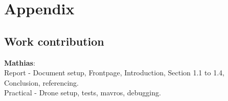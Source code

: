 \chapter{Appendix}
\section*{Work contribution}
\textbf{Mathias}:\\
Report - Document setup, Frontpage,  Introduction, Section  1.1 to 1.4, Conclusion, referencing.\\
Practical - Drone setup, tests, mavros, debugging.


\newpage